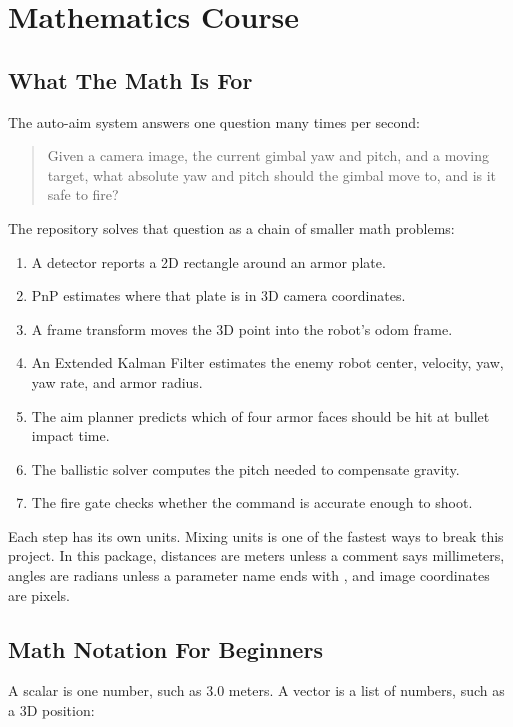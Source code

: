 \chapter{Mathematics Course}

\section{What The Math Is For}

The auto-aim system answers one question many times per second:

\begin{quote}
Given a camera image, the current gimbal yaw and pitch, and a moving target,
what absolute yaw and pitch should the gimbal move to, and is it safe to fire?
\end{quote}

The repository solves that question as a chain of smaller math problems:

\begin{enumerate}
  \item A detector reports a 2D rectangle around an armor plate.
  \item PnP estimates where that plate is in 3D camera coordinates.
  \item A frame transform moves the 3D point into the robot's odom frame.
  \item An Extended Kalman Filter estimates the enemy robot center, velocity,
  yaw, yaw rate, and armor radius.
  \item The aim planner predicts which of four armor faces should be hit at
  bullet impact time.
  \item The ballistic solver computes the pitch needed to compensate gravity.
  \item The fire gate checks whether the command is accurate enough to shoot.
\end{enumerate}

Each step has its own units. Mixing units is one of the fastest ways to break
this project. In this package, distances are meters unless a comment says
millimeters, angles are radians unless a parameter name ends with
, and image coordinates are pixels.

\section{Math Notation For Beginners}

A scalar is one number, such as $3.0$ meters. A vector is a list of numbers,
such as a 3D position:

